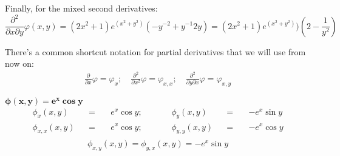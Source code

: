 \documentclass[solutions.tex]{subfiles}
\begin{document}
Finally, for the mixed second derivatives:
\[
	\frac{\partial^2}{\partial x\partial y}\varphi(x,y)
	=(2x^2+1)e^{(x^2+y^2)}(-y^{-2}+y^{-1}2y)
	=\boxed{(2x^2+1)e^{(x^2+y^2)})(2-\frac1{y^2})}
\]
\begin{remark} There's a common shortcut notation for partial derivatives that
we will use from now on:
\begin{equation*} \begin{aligned}
	\frac\partial{\partial x}\varphi = \varphi_x;\quad
	\frac{\partial^2}{\partial x^2}\varphi = \varphi_{x,x};\quad
	\frac{\partial^2}{\partial y\partial x}\varphi = \varphi_{x,y}
\end{aligned} \end{equation*}
\end{remark}

\hr
$\bm{\phi(x,y) = e^x\cos y}$\\
\begin{equation*} \begin{aligned}
	\phi_x(x,y) &&=\quad& \boxed{e^x\cos y;}&\quad&&
	\phi_y(x,y) &&=\quad& \boxed{-e^x\sin y} \\
	\phi_{x,x}(x,y) &&=\quad& \boxed{e^x\cos y;}&\quad&&
	\phi_{y,y}(x,y) &&=\quad& \boxed{-e^x\cos y} \\
\end{aligned} \end{equation*}
\[
	\phi_{x,y}(x,y)=\phi_{y,x}(x,y) = \boxed{-e^x\sin y}
\]
\end{document}
